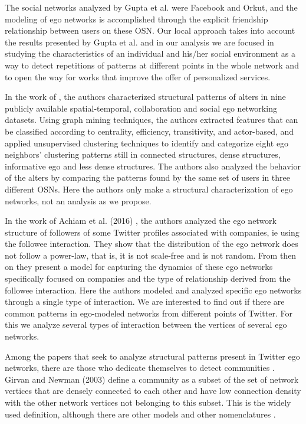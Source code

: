 The social networks analyzed by Gupta et al. were Facebook and Orkut, and the modeling of ego networks is accomplished through the explicit friendship relationship between users on these OSN. Our local approach takes into account the results presented by Gupta et al. and in our analysis we are focused in studying the characteristics of an individual and his/her social environment as a way to detect repetitions of patterns at different points in the whole network and to open the way for works that improve the offer of personalized services.

In the work of \cite{Muhammad2015}, the authors characterized structural patterns of alters in nine publicly available spatial-temporal, collaboration and social ego networking datasets. Using graph mining techniques, the authors extracted features that can be classified according to centrality, efficiency, transitivity, and actor-based, and applied unsupervised clustering techniques to identify and categorize eight ego neighbors' clustering patterns still in connected structures, dense structures, informative ego and less dense structures. The authors also analyzed the behavior of the alters by comparing the patterns found by the same set of users in three different OSNs. Here the authors only make a structural characterization of ego networks, not an analysis as we propose.

In the work of Achiam et al. (2016) \cite{Achiam2016}, the authors analyzed the ego network structure of followers of some Twitter profiles associated with companies, ie using the followee interaction. They show that the distribution of the ego network does not follow a power-law, that is, it is not scale-free and is not random. From then on they present a model for capturing the dynamics of these ego networks specifically focused on companies and the type of relationship derived from the followee interaction. Here the authors modeled and analyzed specific ego networks through a single type of interaction. We are interested to find out if there are common patterns in ego-modeled networks from different points of Twitter. For this we analyze several types of interaction between the vertices of several ego networks.

Among the papers that seek to analyze structural patterns present in Twitter ego networks, there are those who dedicate themselves to detect communities \cite{McAuley:2012,Leskovec2012,Dykstra2014,Epasto2015}. Girvan and Newman (2003) \cite{Girvan2003} define a community as a subset of the set of network vertices that are densely connected to each other and have low connection density with the other network vertices not belonging to this subset. This is the widely used definition, although there are other models and other nomenclatures \cite{Lancichinetti2009b, Lancichinetti2011, Leskovec2012}.

